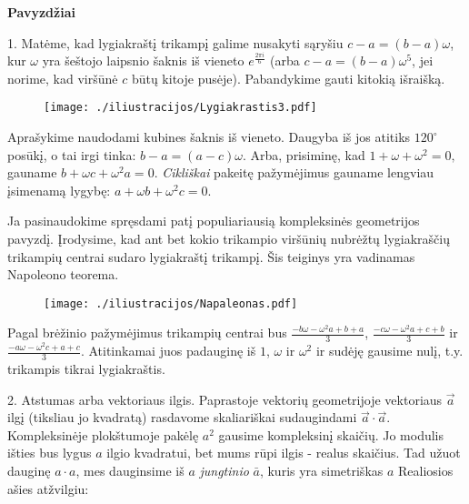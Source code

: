 \begin{center}\textbf{Pavyzdžiai}\end{center}

\medskip

1. Matėme, kad lygiakraštį trikampį galime nusakyti sąryšiu $c-a = (b-a)\omega$, kur $\omega$ yra šeštojo laipsnio šaknis iš vieneto $e^{\frac{2\pi i}{6}}$ (arba $c-a = (b-a)\omega^5$, jei norime, kad viršūnė $c$ būtų kitoje pusėje). Pabandykime gauti kitokią išraišką.  

\begin{figure}[h!]
  \begin{center}
    \texttt{[image: ./iliustracijos/Lygiakrastis3.pdf]}
  \end{center}
\end{figure}

Aprašykime naudodami kubines šaknis iš vieneto. Daugyba iš jos atitiks $120^{\circ}$ posūkį, o tai irgi tinka: $b-a = (a-c)\omega$. Arba, prisiminę, kad $1 + \omega + \omega^2 = 0,$ gauname $b + \omega c + \omega^2a = 0$. {\it Cikliškai} pakeitę pažymėjimus gauname lengviau įsimenamą lygybę: $a + \omega b + \omega^2 c = 0$. 

Ja pasinaudokime spręsdami patį populiariausią kompleksinės geometrijos pavyzdį. Įrodysime, kad ant bet kokio trikampio viršūnių nubrėžtų lygiakraščių trikampių centrai sudaro lygiakraštį trikampį. Šis teiginys yra vadinamas Napoleono teorema.

\begin{figure}[h!]
  \begin{center}
    \texttt{[image: ./iliustracijos/Napaleonas.pdf]}
  \end{center}
\end{figure}

Pagal brėžinio pažymėjimus trikampių centrai bus $\frac{-b\omega - \omega^2 a + b + a}{3}$, $\frac{-c\omega - \omega^2 a + c + b}{3}$ ir $\frac{-a\omega - \omega^2 c + a + c}{3}$. Atitinkamai juos padauginę iš $1$, $\omega$ ir $\omega ^2$ ir sudėję gausime nulį, t.y. trikampis tikrai lygiakraštis.


2. Atstumas arba vektoriaus ilgis. Paprastoje vektorių geometrijoje vektoriaus $\vec{a}$ ilgį (tiksliau jo kvadratą) rasdavome skaliariškai sudaugindami $\vec{a}\cdot\vec{a}$. Kompleksinėje plokštumoje pakėlę $a^2$ gausime kompleksinį skaičių. Jo modulis išties bus lygus $a$ ilgio kvadratui, bet mums rūpi ilgis - realus skaičius. Tad užuot dauginę $a\cdot a$, mes dauginsime iš $a$ {\it jungtinio} $\bar{a}$, kuris yra simetriškas $a$ Realiosios ašies atžvilgiu:

